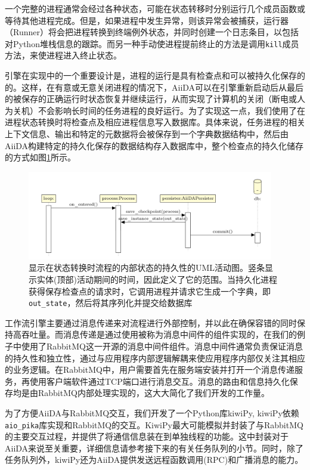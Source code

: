 一个完整的进程通常会经过各种状态，可能在状态转移时分别运行几个成员函数或等待其他进程完成。但是，如果进程中发生异常，则该异常会被捕获，运行器（Runner）将会把进程转换到终端例外状态，并同时创建一个日志条目，以包括对Python堆栈信息的跟踪。而另一种手动使进程提前终止的方法是调用\texttt{kill}成员方法，来使进程进入终止状态。

引擎在实现中的一个重要设计是，进程的运行是具有检查点和可以被持久化保存的的。这样，在有意或无意关闭进程的情况下，AiiDA可以在引擎重新启动后从最后的被保存的正确运行时状态恢复并继续运行，从而实现了计算机的关闭（断电或人为关机）不会影响长时间的任务进程的良好运行。为了实现这一点，我们使用了在进程状态转换时将检查点及相应进程信息写入数据库。具体来说，任务进程的相关上下文信息、输出和特定的元数据将会被保存到一个字典数据结构中，然后由AiiDA构建特定的持久化保存的数据结构存入数据库中，整个检查点的持久化储存的方式如图\ref{fig:persister}所示。

\begin{figure}
  \includegraphics[width=0.96\textwidth]{figs/persister.png}
  \centering
  \caption{显示在状态转换时流程的内部状态的持久性的UML活动图。竖条显示实体(顶部)活动期间的时间，因此定义了它的范围。当持久化进程获得保存检查点的请求时，它调用进程并请求它生成一个字典，即\texttt{out\_state}，然后将其序列化并提交给数据库}
  \label{fig:persister}
\end{figure}

工作流引擎主要通过消息传递来对流程进行外部控制，并以此在确保容错的同时保持高吞吐量。而消息传递是通过使用被称为消息中间件的组件实现的，在我们的例子中使用了RabbitMQ这一开源的消息中间件组件。消息中间件通常负责保证消息的持久性和独立性，通过与应用程序内部逻辑解耦来使应用程序内部仅关注其相应的业务逻辑。在RabbitMQ中，用户需要首先在服务端安装并打开一个消息传递服务，再使用客户端软件通过TCP端口进行消息交互。消息的路由和信息持久化保存均是由RabbitMQ内部处理实现的，这大大简化了我们开发的工作量。

为了方便AiiDA与RabbitMQ交互，我们开发了一个Python库kiwiPy, kiwiPy依赖\texttt{aio\_pika}库实现和RabbitMQ的交互。KiwiPy最大可能模拟并封装了与RabbitMQ的主要交互过程，并提供了将通信信息装在到单独线程的功能。这中封装对于AiiDA来说至关重要，详细信息请参考接下来的有关任务队列的小节。同时，除了任务队列外，kiwiPy还为AiiDA提供发送远程函数调用(RPC)和广播消息的能力。

